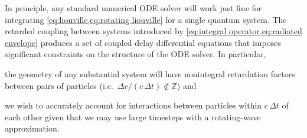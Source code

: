 In principle, any standard numerical ODE solver will work just fine for integrating \cref{eq:liouville,eq:rotating liouville} for a single quantum system.
The retarded coupling between systems introduced by \cref{eq:integral operator,eq:radiated envelope} produces a set of coupled delay differential equations that imposes significant constraints on the structure of the ODE solver.
In particular,
\begin{inparaenum}[(i)]
  \item the geometry of any substantial system will have nonintegral retardation factors between pairs of particles (i.e.\ $\Delta r/(c \, \Delta t) \not \in \mathbb{Z}$) and
  \item we wish to accurately account for interactions between particles within $c \, \Delta t$ of each other given that we may use large timesteps with a rotating-wave approximation.
\end{inparaenum}
